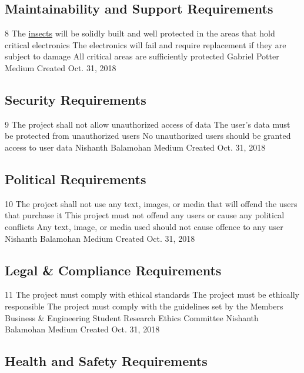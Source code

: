 \documentclass[11pt]{article}
\begin{document}
\subsection{Maintainability and Support Requirements}

\nonFunctionalRequirement
{8}
{The \hyperref[sec:definitions]{insects} will be solidly built and well protected in the areas that hold critical electronics}
{The electronics will fail and require replacement if they are subject to damage}
{All critical areas are sufficiently protected}
{Gabriel Potter}
{Medium}
{Created Oct. 31, 2018}

\subsection{Security Requirements}

\nonFunctionalRequirement
{9}
{The project shall not allow unauthorized access of data}
{The user's data must be protected from unauthorized users}
{No unauthorized users should be granted access to user data}
{Nishanth Balamohan}
{Medium}
{Created Oct. 31, 2018}

\subsection{Political Requirements}

\nonFunctionalRequirement
{10}
{The project shall not use any text, images, or media that will
offend the users that purchase it}
{This project must not offend any users or cause any political conflicts}
{Any text, image, or media used should not cause offence to any user}
{Nishanth Balamohan}
{Medium}
{Created Oct. 31, 2018}

\subsection{Legal \& Compliance Requirements}

\nonFunctionalRequirement
{11}
{The project must comply with ethical standards}
{The project must be ethically responsible}
{The project must comply with the guidelines set by the Members Business \& Engineering Student Research Ethics Committee}
{Nishanth Balamohan}
{Medium}
{Created Oct. 31, 2018}

\subsection{Health and Safety Requirements}
\end{document}
